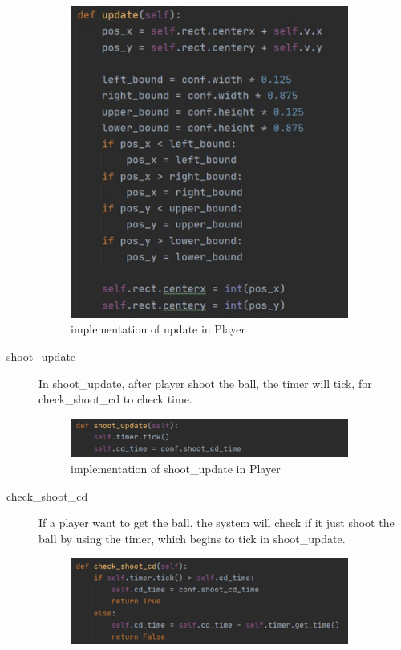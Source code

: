 \documentclass[14pt]{extarticle}
\begin{document}
\begin{description}
\begin{figure}[H]
\begin{center}
			\includegraphics[width=0.9\textwidth]{Player_update}
			\caption{implementation of update in Player}
		\end{center}
	\end{figure}
	\item[shoot\_update]
	In shoot\_update, after player shoot the ball, the timer will tick, for check\_shoot\_cd to check time.
	\begin{figure}[H]
		\begin{center}
			\includegraphics[width=0.9\textwidth]{Player_shoot_update}
			\caption{implementation of shoot\_update in Player}
		\end{center}
	\end{figure}
	\item[check\_shoot\_cd]
	If a player want to get the ball, the system will check if it just shoot the ball by using the timer, which begins to tick in shoot\_update.
	\begin{figure}[H]
		\begin{center}
			\includegraphics[width=0.9\textwidth]{Player_check_shoot_cd}

\end{center}
\end{figure}
\end{description}
\end{document}
